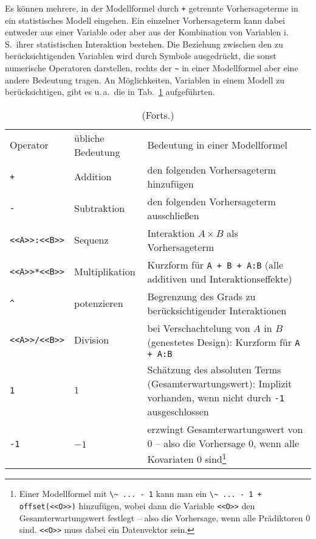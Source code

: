 Es können mehrere, in der Modellformel durch \lstinline!+! getrennte Vorhersageterme in ein statistisches Modell eingehen. Ein einzelner Vorhersageterm kann dabei entweder aus einer Variable oder aber aus der Kombination von Variablen i.\,S.\ ihrer statistischen Interaktion bestehen. Die Beziehung zwischen den zu berücksichtigenden Variablen wird durch Symbole ausgedrückt, die sonst numerische Operatoren darstellen, rechts der \lstinline!~! in einer Modellformel aber eine andere Bedeutung tragen. An Möglichkeiten, Variablen in einem Modell zu berücksichtigen, gibt es u.\,a.\ die in Tab.\ \ref{tab:formula} aufgeführten.

\begin{longtable}{p{1.5cm}p{3cm}p{8cm}}
\caption{Notation für die Modellformel linearer Modelle}
\label{tab:formula}
\endfirsthead
\caption[]{(Forts.)}\\\hline
\endhead
\hline
\sffamily Operator & \sffamily übliche Bedeutung & \sffamily Bedeutung in einer Modellformel\\\hline\hline
\lstinline!+!\index[func]{+@\lstinline{+}} & Addition & den folgenden Vorhersageterm hinzufügen\\
\lstinline!-!\index[func]{-@\lstinline{-}} & Subtraktion & den folgenden Vorhersageterm ausschließen\\
\lstinline!<<A>>:<<B>>!\index[func]{:@\lstinline{:}} & Sequenz & Interaktion $A \times B$ als Vorhersageterm\\
\lstinline!<<A>>*<<B>>!\index[func]{*@\lstinline{*}} & Multiplikation & Kurzform für \lstinline!A + B + A:B! (alle additiven und Interaktionseffekte)\\
\lstinline!^!\index[func]{^@\lstinline{^}} & potenzieren & Begrenzung des Grads zu berücksichtigender Interaktionen\\
\lstinline!<<A>>/<<B>>!\index[func]{/@\lstinline{/}} & Division & bei Verschachtelung von $A$ in $B$ (genestetes Design): Kurzform für \lstinline!A + A:B!\\
\lstinline!1!\index[func]{1, -1@\lstinline{1, -1}} & $1$ & Schätzung des absoluten Terms (Gesamterwartungswert): Implizit vorhanden, wenn nicht durch \lstinline!-1! ausgeschlossen\\
\lstinline!-1!\index[func]{1, -1@\lstinline{1, -1}} & $-1$ & erzwingt Gesamterwartungswert von 0 -- also die Vorhersage 0, wenn alle Kovariaten 0 sind\footnote{Einer Modellformel mit \lstinline!\~ ... - 1! kann man ein \lstinline!\~ ... - 1 + offset(<<O>>)! hinzufügen, wobei dann die Variable \lstinline!<<O>>! den Gesamterwartungswert festlegt -- also die Vorhersage, wenn alle Prädiktoren $0$ sind. \lstinline!<<O>>! muss dabei ein Datenvektor sein.}\\

\end{longtable}
